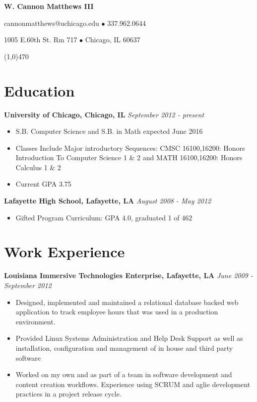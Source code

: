 \documentclass[10pt,letterpaper]{article} %
\begin{document}
 
    \centerline{\LARGE \bf W. Cannon Matthews III} 
    \centerline{ cannonmatthews@uchicago.edu  $\bullet$ 337.962.0644 } 
    \centerline{1005 E.60th St. Rm 717 $\bullet$ Chicago, IL 60637 }
    \line(1,0){470} 
    \section*{Education}
        \textbf{University of Chicago, Chicago, IL } \hfill \textit{ September 2012 - present } 
         \begin{itemize} 
            \item S.B. Computer Science and S.B. in Math expected June 2016 
            \item Classes Include Major introductory Sequences: CMSC 16100,16200: Honors Introduction To Computer Science 1 \& 2 and MATH 16100,16200: Honors Calculus 1 \& 2
            \item Current GPA 3.75  
        \end{itemize}
        \textbf{ Lafayette High School, Lafayette, LA } \hfill \textit{August 2008 - May 2012 }  
        \begin{itemize} 
            \item Gifted Program Curriculum: GPA 4.0, graduated 1 of 462
        \end{itemize}
    \section*{Work Experience} 
        \textbf{Louisiana Immersive Technologies Enterprise, Lafayette, LA} \hfill \textit{June 2009 - September 2012} \\
        \indent 
            \begin{itemize} 
            \item  Designed, implemented and maintained a relational database backed web application to track 
                   employee hours that was used in a production environment.
            \item  Provided Linux Systems Administration and Help Desk Support as well as installation, configuration and 
                    management of in house and third party software 
            \item  Worked on my own and as part of a team in software development and content creation workflows. Experience using SCRUM and aglie development practices in a project release cycle.
            \end{itemize} 
\end{document}
